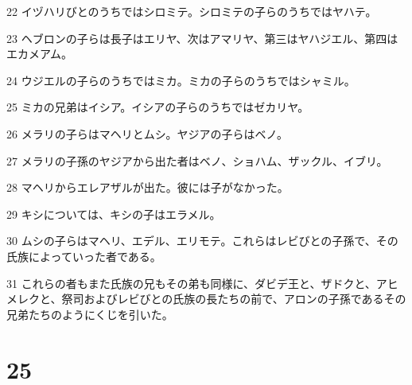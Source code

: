 \par 22 イヅハリびとのうちではシロミテ。シロミテの子らのうちではヤハテ。
\par 23 ヘブロンの子らは長子はエリヤ、次はアマリヤ、第三はヤハジエル、第四はエカメアム。
\par 24 ウジエルの子らのうちではミカ。ミカの子らのうちではシャミル。
\par 25 ミカの兄弟はイシア。イシアの子らのうちではゼカリヤ。
\par 26 メラリの子らはマヘリとムシ。ヤジアの子らはベノ。
\par 27 メラリの子孫のヤジアから出た者はベノ、ショハム、ザックル、イブリ。
\par 28 マヘリからエレアザルが出た。彼には子がなかった。
\par 29 キシについては、キシの子はエラメル。
\par 30 ムシの子らはマヘリ、エデル、エリモテ。これらはレビびとの子孫で、その氏族によっていった者である。
\par 31 これらの者もまた氏族の兄もその弟も同様に、ダビデ王と、ザドクと、アヒメレクと、祭司およびレビびとの氏族の長たちの前で、アロンの子孫であるその兄弟たちのようにくじを引いた。

\chapter{25}

